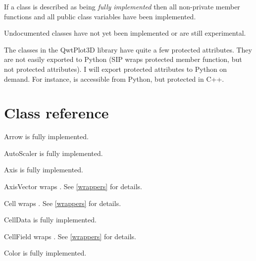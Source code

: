 \documentclass{manual}
\newcommand{\Future}{
  \begin{notice}[warning]
    The documentation is for the future PyQwt3D-0.1.6 which has not yet been
    released.  Please refer, to the documentation in the release that you are
    using.
  \end{notice}
}
\renewcommand{\Future}{}
\begin{document}
If a class is described as being \emph{fully implemented} then all non-private
member functions and all public class variables have been implemented.

Undocumented classes have not yet been implemented or are still experimental.

The classes in the QwtPlot3D library have quite a few protected attributes.
They are not easily exported to Python (SIP wraps protected member function,
but not protected attributes).
I will export protected attributes to Python on demand. For instance,
 is accessible from Python, but protected in C++.


\section{Class reference \label{classes}}

\Future{}

\begin{classdesc*}{Arrow}
  is fully implemented.
\end{classdesc*}

\begin{classdesc*}{AutoScaler}
  is fully implemented.
\end{classdesc*}

\begin{classdesc*}{Axis}
  is fully implemented.
\end{classdesc*}

\begin{classdesc*}{AxisVector}
  wraps . See \ref{wrappers} for details.
\end{classdesc*}

\begin{classdesc*}{Cell}
  wraps . See \ref{wrappers} for details.
\end{classdesc*}

\begin{classdesc*}{CellData}
  is fully implemented.
\end{classdesc*}

\begin{classdesc*}{CellField}
  wraps . See \ref{wrappers} for details.
\end{classdesc*}

\begin{classdesc*}{Color}
  is fully implemented.
\end{classdesc*}
\end{document}

